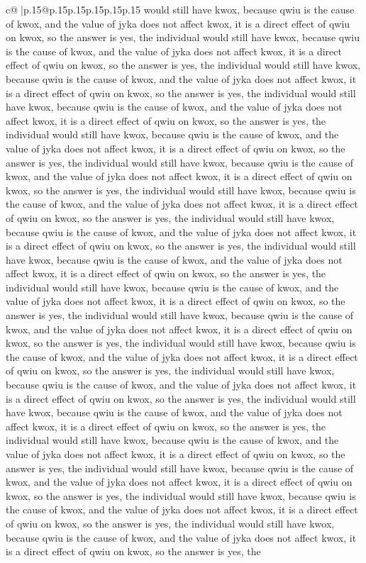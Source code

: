 \documentclass{article}
\begin{document}
{\begin{supertabular}{c@{$\;$}|p{.15\linewidth}@{}p{.15\linewidth}p{.15\linewidth}p{.15\linewidth}p{.15\linewidth}p{.15\linewidth}}
{{{would still have kwox, because qwiu is the cause of kwox, and the value of jyka does not affect kwox, it is a direct effect of qwiu on kwox, so the answer is yes, the individual would still have kwox, because qwiu is the cause of kwox, and the value of jyka does not affect kwox, it is a direct effect of qwiu on kwox, so the answer is yes, the individual would still have kwox, because qwiu is the cause of kwox, and the value of jyka does not affect kwox, it is a direct effect of qwiu on kwox, so the answer is yes, the individual would still have kwox, because qwiu is the cause of kwox, and the value of jyka does not affect kwox, it is a direct effect of qwiu on kwox, so the answer is yes, the individual would still have kwox, because qwiu is the cause of kwox, and the value of jyka does not affect kwox, it is a direct effect of qwiu on kwox, so the answer is yes, the individual would still have kwox, because qwiu is the cause of kwox, and the value of jyka does not affect kwox, it is a direct effect of qwiu on kwox, so the answer is yes, the individual would still have kwox, because qwiu is the cause of kwox, and the value of jyka does not affect kwox, it is a direct effect of qwiu on kwox, so the answer is yes, the individual would still have kwox, because qwiu is the cause of kwox, and the value of jyka does not affect kwox, it is a direct effect of qwiu on kwox, so the answer is yes, the individual would still have kwox, because qwiu is the cause of kwox, and the value of jyka does not affect kwox, it is a direct effect of qwiu on kwox, so the answer is yes, the individual would still have kwox, because qwiu is the cause of kwox, and the value of jyka does not affect kwox, it is a direct effect of qwiu on kwox, so the answer is yes, the individual would still have kwox, because qwiu is the cause of kwox, and the value of jyka does not affect kwox, it is a direct effect of qwiu on kwox, so the answer is yes, the individual would still have kwox, because qwiu is the cause of kwox, and the value of jyka does not affect kwox, it is a direct effect of qwiu on kwox, so the answer is yes, the individual would still have kwox, because qwiu is the cause of kwox, and the value of jyka does not affect kwox, it is a direct effect of qwiu on kwox, so the answer is yes, the individual would still have kwox, because qwiu is the cause of kwox, and the value of jyka does not affect kwox, it is a direct effect of qwiu on kwox, so the answer is yes, the individual would still have kwox, because qwiu is the cause of kwox, and the value of jyka does not affect kwox, it is a direct effect of qwiu on kwox, so the answer is yes, the individual would still have kwox, because qwiu is the cause of kwox, and the value of jyka does not affect kwox, it is a direct effect of qwiu on kwox, so the answer is yes, the individual would still have kwox, because qwiu is the cause of kwox, and the value of jyka does not affect kwox, it is a direct effect of qwiu on kwox, so the answer is yes, the individual would still have kwox, because qwiu is the cause of kwox, and the value of jyka does not affect kwox, it is a direct effect of qwiu on kwox, so the answer is yes, the }}}
\end{supertabular}}
\end{document}
